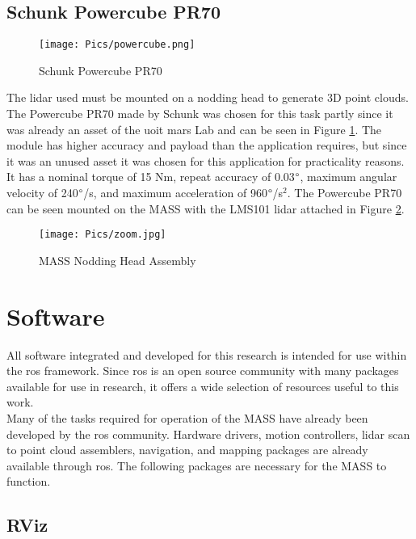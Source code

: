 \subsection{Schunk Powercube PR70}
\begin{figure}[H]
    \centering
    \texttt{[image: Pics/powercube.png]}
    \caption{Schunk Powercube PR70 \cite{schunkpage}}
    \label{fig:schunk}
\end{figure}
The \acrshort{lidar} used must be mounted on a nodding head to generate 3D point clouds. The Powercube PR70 made by Schunk was chosen for this task partly since it was already an asset of the \acrshort{uoit} \acrshort{mars} Lab and can be seen in Figure \ref{fig:schunk}. The module has higher accuracy and payload than the application requires, but since it was an unused asset it was chosen for this application for practicality reasons. It has a nominal torque of 15 Nm, repeat accuracy of 0.03$\degree$, maximum angular velocity of 240$\degree$/s, and maximum acceleration of 960$\degree$/s$^2$. The Powercube PR70 can be seen mounted on the MASS with the LMS101 \acrshort{lidar} attached in Figure \ref{fig:lidarmass}.\\
\begin{figure}[H]
    \centering
    \texttt{[image: Pics/zoom.jpg]}
    \caption{MASS Nodding Head Assembly}
    \label{fig:lidarmass}
\end{figure}
\section{Software}
\label{sec:software}
All software integrated and developed for this research is intended for use within the \acrshort{ros} framework. Since \acrshort{ros} is an open source community with many packages available for use in research, it offers a wide selection of resources useful to this work.\\

Many of the tasks required for operation of the MASS have already been developed by the \acrshort{ros} community. Hardware drivers, motion controllers, \acrshort{lidar} scan to point cloud assemblers, navigation, and mapping packages are already available through \acrshort{ros}. The following packages are necessary for the MASS to function.\\
\subsection{RViz}
\label{sec:RViz}

